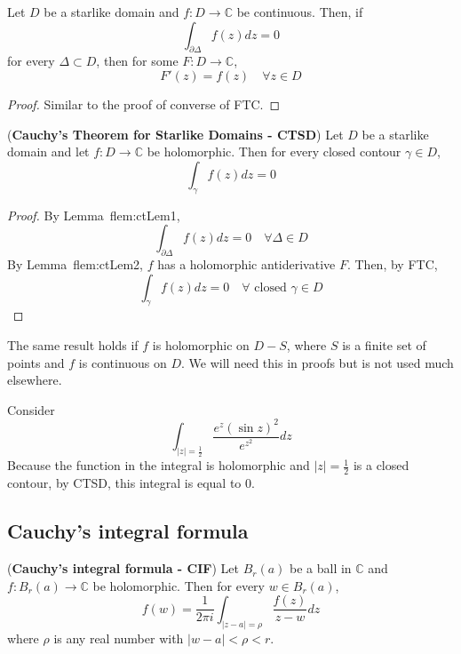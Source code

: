\begin{lemma}\label{lem:ctLem2}
	Let $D$ be a starlike domain and $f: D \rightarrow \mathbb{C}$ be continuous. Then, if
	\[
		\int_{\partial \Delta} f(z) dz = 0
	\]
	for every $\Delta \subset D$, then for some $F: D \rightarrow \mathbb{C}$,
	\[
		F'(z) = f(z) \quad \forall z \in D
	\]
\end{lemma}

\begin{proof}
	Similar to the proof of converse of FTC.
\end{proof}

\begin{theorem}
	(\textbf{Cauchy's Theorem for Starlike Domains - CTSD}) Let $D$ be a starlike domain and let $f: D \rightarrow \mathbb{C}$ be holomorphic. Then for every closed contour $\gamma \in D$,
	\[
		\int_{\gamma} f(z) dz = 0
	\]
\end{theorem}

\begin{proof}
	By Lemma~f{lem:ctLem1},
	\[
		\int_{\partial \Delta} f(z) dz = 0 \quad \forall \Delta \in D
	\]
	By Lemma~f{lem:ctLem2}, $f$ has a holomorphic antiderivative $F$. Then, by FTC,
	\[
		\int_{\gamma} f(z) dz = 0 \quad \forall \text{ closed } \gamma \in D
	\]
\end{proof}

\begin{remark}
	The same result holds if $f$ is holomorphic on $D - S$, where $S$ is a finite set of points and $f$ is continuous on $D$. We will need this in proofs but is not used much elsewhere.
\end{remark}

\begin{example}
	Consider
	\[
		\int_{|z| = \frac{1}{2}} \frac{e^z {(\sin z)}^2}{e^{z^2}} dz
	\]
	Because the function in the integral is holomorphic and $|z| = \frac{1}{2}$ is a closed contour, by CTSD, this integral is equal to $0$.
\end{example}

\subsection{Cauchy's integral formula}

\begin{theorem}
	(\textbf{Cauchy's integral formula - CIF}) Let $B_r(a)$ be a ball in $\mathbb{C}$ and $f: B_r(a) \rightarrow \mathbb{C}$ be holomorphic. Then for every $w \in B_r(a)$,
	\[
		f(w) = \frac{1}{2 \pi i} \int_{|z - a| = \rho} \frac{f(z)}{z - w} dz
	\]
	where $\rho$ is any real number with $|w - a| < \rho < r$.
\end{theorem}

